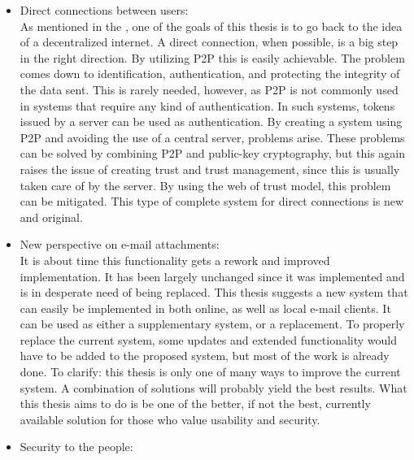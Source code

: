 \begin{itemize}
	\item Direct connections between users:\\
	As mentioned in the , one of the goals of this thesis is to go back to the idea of a decentralized internet. A direct connection, when possible, is a big step in the right direction. By utilizing P2P this is easily achievable. The problem comes down to identification, authentication, and protecting the integrity of the data sent. This is rarely needed, however, as P2P is not commonly used in systems that require any kind of authentication. In such systems, tokens issued by a server can be used as authentication. By creating a system using P2P and avoiding the use of a central server, problems arise. These problems can be solved by combining P2P and public-key cryptography, but this again raises the issue of creating trust and trust management, since this is usually taken care of by the server. By using the web of trust model, this problem can be mitigated. This type of complete system for direct connections is new and original.
	\item New perspective on e-mail attachments:\\
	It is about time this functionality gets a rework and improved implementation. It has been largely unchanged since it was implemented and is in desperate need of being replaced. This thesis suggests a new system that can easily be implemented in both online, as well as local e-mail clients. It can be used as either a supplementary system, or a replacement. To properly replace the current system, some updates and extended functionality would have to be added to the proposed system, but most of the work is already done. To clarify: this thesis is only one of many ways to improve the current system. A combination of solutions will probably yield the best results. What this thesis aims to do is be one of the better, if not the best, currently available solution for those who value usability and security.
	\item Security to the people:\\

\end{itemize}
